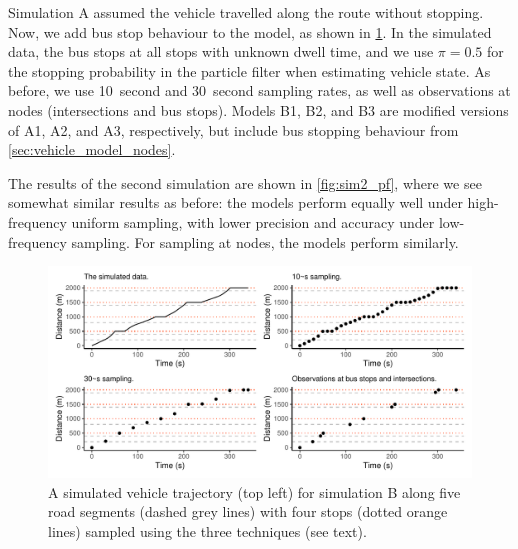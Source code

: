 Simulation A assumed the vehicle travelled along the route without stopping. Now, we add bus stop behaviour to the model, as shown in \cref{fig:sim2_graph}. In the simulated data, the bus stops at all stops with unknown dwell time, and we use $\pi=0.5$ for the stopping probability in the particle filter when estimating vehicle state. As before, we use 10~second and 30~second sampling rates, as well as observations at nodes (intersections and bus stops). Models B1, B2, and B3 are modified versions of A1, A2, and A3, respectively, but include bus stopping behaviour from \cref{sec:vehicle_model_nodes}.




\afterpage{\clearpage}

The results of the second simulation are shown in \cref{fig:sim2_pf}, where we see somewhat similar results as before: the models perform equally well under high-frequency uniform sampling, with lower precision and accuracy under low-frequency sampling. For sampling at nodes, the models perform similarly.

\begin{knitrout}\small
{}\color{fgcolor}\begin{figure}
\includegraphics[width=\linewidth]{figure/sim2_graph-1} \caption[Vehicle trajectory with sampled observations for simulation B]{A simulated vehicle trajectory (top left) for simulation B along five road segments (dashed grey lines) with four stops (dotted orange lines) sampled using the three techniques (see text).}\label{fig:sim2_graph}
\end{figure}


\end{knitrout}

